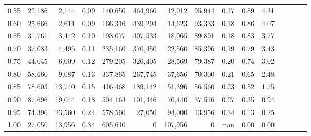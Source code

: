 \begin{tabular}{rrrcrrrrrrrrrrr}
0.55 &  22,186 &   2,144 &                                       0.09 &  140,650 &  464,960 &   12,012 &   95,944 &  0.17 &  0.89 &                         4.31 \\
0.60 &  25,666 &   2,611 &                                       0.09 &  166,316 &  439,294 &   14,623 &   93,333 &  0.18 &  0.86 &                         4.07 \\
0.65 &  31,761 &   3,442 &                                       0.10 &  198,077 &  407,533 &   18,065 &   89,891 &  0.18 &  0.83 &                         3.77 \\
0.70 &  37,083 &   4,495 &                                       0.11 &  235,160 &  370,450 &   22,560 &   85,396 &  0.19 &  0.79 &                         3.43 \\
0.75 &  44,045 &   6,009 &                                       0.12 &  279,205 &  326,405 &   28,569 &   79,387 &  0.20 &  0.74 &                         3.02 \\
0.80 &  58,660 &   9,087 &                                       0.13 &  337,865 &  267,745 &   37,656 &   70,300 &  0.21 &  0.65 &                         2.48 \\
0.85 &  78,603 &  13,740 &                                       0.15 &  416,468 &  189,142 &   51,396 &   56,560 &  0.23 &  0.52 &                         1.75 \\
0.90 &  87,696 &  19,044 &                                       0.18 &  504,164 &  101,446 &   70,440 &   37,516 &  0.27 &  0.35 &                         0.94 \\
0.95 &  74,396 &  23,560 &                                       0.24 &  578,560 &   27,050 &   94,000 &   13,956 &  0.34 &  0.13 &                         0.25 \\
1.00 &  27,050 &  13,956 &                                       0.34 &  605,610 &        0 &  107,956 &        0 &   nan &  0.00 &                         0.00 \\
\bottomrule
\end{tabular}
